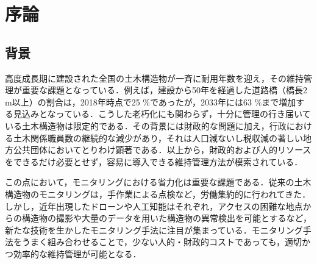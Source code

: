 \section{序論}\label{sec:intro}
\subsection{背景}\label{subsec:background}

\begin{comment}
近年インフラの老朽化が進み，インフラ維持管理の無人化および低コスト化が求められている．
日本では高度経済成長期に集中的に整備されたインフラが一斉に高齢化しており,国土交通省\cite{h25report}によれば，2033年までに建設後50年以上経過する
道路橋（橋長２ｍ以上）の割合は,2018年時点の約25\%から約63\%まで増加する見込みとなっている．
インフラの中で日常的に管理されているのは比較的大規模なインフラだけであり，予算がないために日常的な実態調査ができていない例が多い．
地方公共団体の土木関係職員数は継続的に減少しており\cite{soumushou}，インフラの維持管理に関する人員不足も懸念されている．
また，インフラの中には維持管理方法を導入する際に止められない例も多く，インフラを止めずに簡易的に導入できる維持管理方法が好ましい．
そのため，できるだけコストと人をかけずに簡単に導入できるインフラ維持管理方法が模索されている．
\end{comment}
高度成長期に建設された全国の土木構造物が一斉に耐用年数を迎え，その維持管理が重要な課題となっている．例えば，建設から50年を経過した道路橋（橋長2 m以上）の割合は，2018年時点で25 \%であったが，2033年には63 \%まで増加する見込みとなっている\cite{h25report}．こうした老朽化にも関わらず，十分に管理の行き届いている土木構造物は限定的である．その背景には財政的な問題に加え，行政における土木関係職員数の継続的な減少があり\cite{soumushou}，それは人口減ないし税収減の著しい地方公共団体においてとりわけ顕著である．以上から，財政的および人的リソースをできるだけ必要とせず，容易に導入できる維持管理方法が模索されている．

\begin{comment}
インフラ維持管理の無人化・低コスト化を果たす上で，モニタリング技術の省力化は喫緊の課題である．
これまでインフラ構造物のモニタリングの多くは手作業による点検といった形で属人的に行われてきた．
しかし近年，ドローンや人工知能を活かした新たな手法に注目が集まっている．
ドローンによる人が行きにくい場所からの構造物の撮影や，人工知能による構造物の画像からのひび割れの自動検出等がその例である．
構造物を継続的に監視するモニタリング技術の発達は，適切かつ効率的なメンテナンスを行うことに大きく貢献しうる
\end{comment}
この点において，モニタリングにおける省力化は重要な課題である．従来の土木構造物のモニタリングは，手作業による点検など，労働集約的に行われてきた．しかし，近年出現したドローンや人工知能はそれぞれ，アクセスの困難な地点からの構造物の撮影や大量のデータを用いた構造物の異常検出を可能とするなど，新たな技術を生かしたモニタリング手法に注目が集まっている．モニタリング手法をうまく組み合わせることで，少ない人的・財政的コストであっても，適切かつ効率的な維持管理が可能となる．

